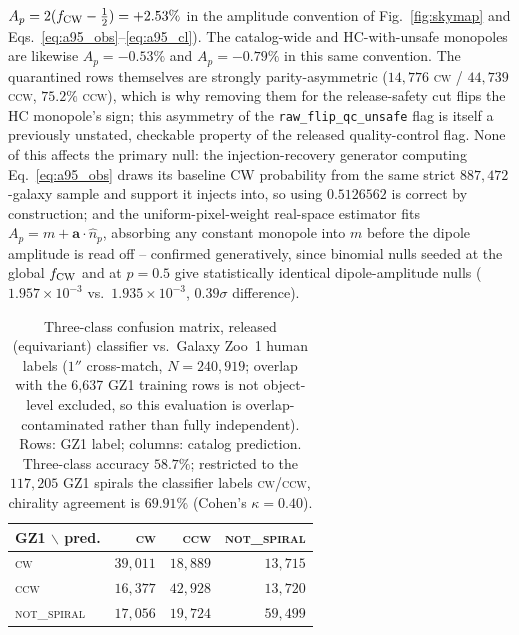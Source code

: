 \documentclass[twocolumn,linenumbers]{aastex702}
\newcommand{\CW}{\textsc{cw}}
\newcommand{\CCW}{\textsc{ccw}}
\newcommand{\NS}{\textsc{not\_spiral}}
\newcommand{\sigmaunit}{\sigma}
\begin{document}
$A_p=2(f_{\rm CW}-\tfrac12)=+2.53\%$ in the amplitude convention of
Fig.~\ref{fig:skymap} and Eqs.~\ref{eq:a95_obs}--\ref{eq:a95_cl}). The
catalog-wide and HC-with-unsafe monopoles are likewise
$A_p=-0.53\%$ and $A_p=-0.79\%$ in this same convention. The quarantined rows
themselves are strongly parity-asymmetric ($14{,}776$ \CW{} /
$44{,}739$ \CCW{}, $75.2\%$ \CCW{}), which is why removing them for the
release-safety cut flips the HC monopole's sign; this asymmetry of the
\texttt{raw\_flip\_qc\_unsafe} flag is itself a previously unstated,
checkable property of the released quality-control flag. None of this
affects the primary null: the injection-recovery generator computing
Eq.~\ref{eq:a95_obs} draws its baseline CW probability from the same
strict $887{,}472$-galaxy sample and support it injects into, so using
$0.5126562$ is correct by construction; and the uniform-pixel-weight
real-space estimator fits $A_p=m+\bm a\cdot\hat n_p$, absorbing any
constant monopole into $m$ before the dipole amplitude is read off --
confirmed generatively, since binomial nulls seeded at the global $f_{\rm
CW}$ and at $p=0.5$ give statistically identical dipole-amplitude nulls
($1.957\times10^{-3}$ vs.\ $1.935\times10^{-3}$, $0.39\sigmaunit$
difference).

\begin{table}[t]
\caption{Three-class confusion matrix, released (equivariant) classifier
vs.\ Galaxy Zoo~1 human labels ($1''$ cross-match, $N=240{,}919$; overlap
with the 6,637 GZ1 training rows is not object-level excluded, so this
evaluation is overlap-contaminated rather than fully independent). Rows:
GZ1 label; columns: catalog prediction. Three-class accuracy $58.7\%$;
restricted to the $117{,}205$ GZ1 spirals the classifier labels \CW/\CCW,
chirality agreement is $69.91\%$ (Cohen's $\kappa=0.40$).
\label{tab:gz1_confusion}}
\begin{tabular}{lrrr}
\toprule
GZ1 $\backslash$ pred. & \CW & \CCW & \NS \\
\midrule
\CW & $39{,}011$ & $18{,}889$ & $13{,}715$ \\
\CCW & $16{,}377$ & $42{,}928$ & $13{,}720$ \\
\NS & $17{,}056$ & $19{,}724$ & $59{,}499$ \\
\bottomrule
\end{tabular}
\end{table}
\end{document}
